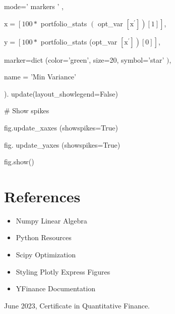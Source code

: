 \documentclass[10pt]{article}
\begin{document}
mode=' markers ' ,

$\mathrm{x}=\left[100 *\right.$ portfolio\_stats $\left(\right.$ opt\_var $\left.\left.\left[\mathrm{x}^{\prime}\right]\right)[1]\right]$,

$\mathrm{y}=\left[100 *\right.$ portfolio\_stats (opt\_var $\left.\left.\left[\mathrm{x}^{\prime}\right]\right)[0]\right]$,

marker=dict (color='green', size=20, symbol='star' $)$,

name = 'Min Variance'

). update(layout\_showlegend=False)

\# Show spikes

fig.update\_xaxes (showspikes=True)

fig. update\_yaxes (showspikes=True)

fig.show()

\section*{References}
\begin{itemize}
  \item Numpy Linear Algebra

  \item Python Resources

  \item Scipy Optimization

  \item Styling Plotly Express Figures

  \item YFinance Documentation

\end{itemize}

June 2023, Certificate in Quantitative Finance.
\end{document}
